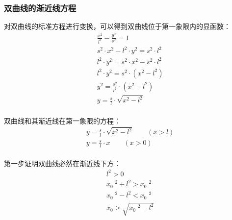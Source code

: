 \documentclass[UTF8]{ctexart}
\begin{document}
\subsubsection{双曲线的渐近线方程}
    对双曲线的标准方程进行变换，可以得到双曲线位于第一象限内的显函数：\vspace{3pt}
    \setcounter{equation}{0}
    \begin{align}
        &\frac{x^2}{l^2}-\frac{y^2}{s^2}=1\\[3mm]
        &s^2\cdot x^2-l^2\cdot y^2=s^2\cdot l^2\\[3mm]
        &l^2\cdot y^2=s^2\cdot x^2-s^2\cdot l^2\\[3mm]
        &l^2\cdot y^2=s^2\cdot \left(x^2-l^2\right)\\[3mm]
        &y^2=\frac{s^2}{l^2}\cdot \left(x^2-l^2\right)\\[3mm]
        &y=\frac{s}{l}\cdot \sqrt{x^2-l^2}
    \end{align}\\[1mm]
    双曲线和其渐近线在第一象限的方程：\vspace{3pt}
    \begin{align}
        &y=\frac{s}{l}\cdot \sqrt{x^2-l^2}\qquad(x>l)\\[4mm]
        &y=\frac{s}{l}\cdot x\qquad(x>0)
    \end{align}\\[1mm]
    第一步证明双曲线必然在渐近线下方：\vspace{3pt}
    \begin{align}
        &l^2>0\\[3mm]
        &x_0\;^2+l^2>x_0\;^2\\[3mm]
        &x_0\;^2-l^2<x_0\;^2\\[3mm]
        &x_0>\sqrt{x_0\;^2-l^2}
    \end{align}

\newpage
\end{document}
